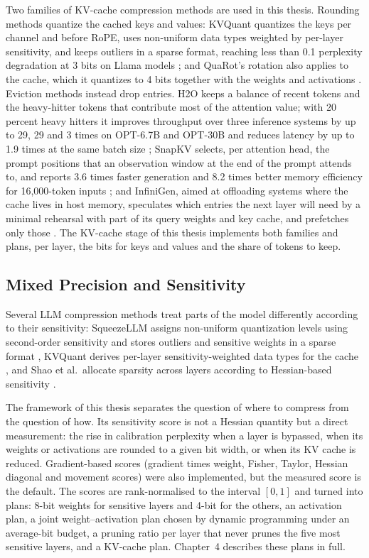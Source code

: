 \documentclass[
11pt, %
english, %
singlespacing, %
headsepline, %
]{MastersDoctoralThesis} %
\begin{document}
Two families of KV-cache compression methods are used in this thesis. Rounding methods quantize the cached keys and values: KVQuant quantizes the keys per channel and before RoPE, uses non-uniform data types weighted by per-layer sensitivity, and keeps outliers in a sparse format, reaching less than 0.1 perplexity degradation at 3 bits on Llama models \cite{hooper2024kvquant}; and QuaRot's rotation also applies to the cache, which it quantizes to 4 bits together with the weights and activations \cite{ashkboos2024quarot}. Eviction methods instead drop entries. H2O keeps a balance of recent tokens and the heavy-hitter tokens that contribute most of the attention value; with 20 percent heavy hitters it improves throughput over three inference systems by up to 29, 29 and 3 times on OPT-6.7B and OPT-30B and reduces latency by up to 1.9 times at the same batch size \cite{zhang2023h2o}; SnapKV selects, per attention head, the prompt positions that an observation window at the end of the prompt attends to, and reports 3.6 times faster generation and 8.2 times better memory efficiency for 16{,}000-token inputs \cite{li2024snapkv}; and InfiniGen, aimed at offloading systems where the cache lives in host memory, speculates which entries the next layer will need by a minimal rehearsal with part of its query weights and key cache, and prefetches only those \cite{lee2024infinigen}. The KV-cache stage of this thesis implements both families and plans, per layer, the bits for keys and values and the share of tokens to keep.

\subsection{Mixed Precision and Sensitivity}
\label{sec:ch2-mixed}

Several LLM compression methods treat parts of the model differently according to their sensitivity: SqueezeLLM assigns non-uniform quantization levels using second-order sensitivity and stores outliers and sensitive weights in a sparse format \cite{kim2024squeezellm}, KVQuant derives per-layer sensitivity-weighted data types for the cache \cite{hooper2024kvquant}, and Shao et al.\ allocate sparsity across layers according to Hessian-based sensitivity \cite{shao2024sensitivity}.

The framework of this thesis separates the question of where to compress from the question of how. Its sensitivity score is not a Hessian quantity but a direct measurement: the rise in calibration perplexity when a layer is bypassed, when its weights or activations are rounded to a given bit width, or when its KV cache is reduced. Gradient-based scores (gradient times weight, Fisher, Taylor, Hessian diagonal and movement scores) were also implemented, but the measured score is the default. The scores are rank-normalised to the interval $[0, 1]$ and turned into plans: 8-bit weights for sensitive layers and 4-bit for the others, an activation plan, a joint weight--activation plan chosen by dynamic programming under an average-bit budget, a pruning ratio per layer that never prunes the five most sensitive layers, and a KV-cache plan. Chapter~4 describes these plans in full.
\end{document}
